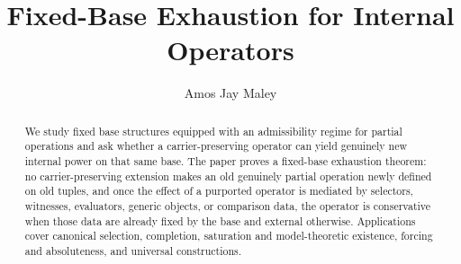 \documentclass[reqno]{amsart}
\title[Fixed-Base Exhaustion]{Fixed-Base Exhaustion for Internal Operators}
\author[Maley]{Amos Jay Maley}
\date{}
\begin{document}
\begin{abstract}
We study fixed base structures equipped with an admissibility regime for partial operations and ask whether a carrier-preserving operator can yield genuinely new internal power on that same base. The paper proves a fixed-base exhaustion theorem: no carrier-preserving extension makes an old genuinely partial operation newly defined on old tuples, and once the effect of a purported operator is mediated by selectors, witnesses, evaluators, generic objects, or comparison data, the operator is conservative when those data are already fixed by the base and external otherwise. Applications cover canonical selection, completion, saturation and model-theoretic existence, forcing and absoluteness, and universal constructions.
\end{abstract}

\maketitle












\appendix





\end{document}
